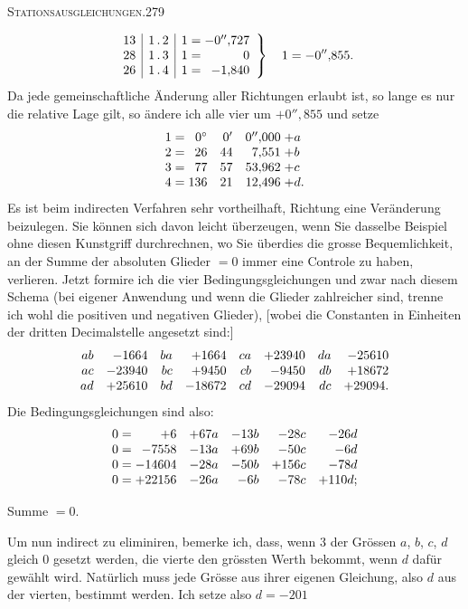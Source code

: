 \clearpage
\noindent\mbox{}\hfill\textsc{Stationsausgleichungen.}\hfill279\par\medskip
\[
\left.\begin{array}{r|c|r@{\;}c@{\;}r}
13&1\,.\,2&1&=&-0''{,}727\\
28&1\,.\,3&1&=&0\\
26&1\,.\,4&1&=&-1{,}840
\end{array}\right\}\quad1=-0''{,}855.
\]
Da jede gemeinschaftliche Änderung aller Richtungen erlaubt ist, so lange es nur die relative Lage gilt, so ändere ich alle vier um $+0''{,}855$ und setze
\[
\begin{array}{r@{\;}c@{\;}rrr@{\;}l}
1&=&0^\circ&0'&0''{,}000&+a\\
2&=&26&44&7{,}551&+b\\
3&=&77&57&53{,}962&+c\\
4&=&136&21&12{,}496&+d.
\end{array}
\]
Es ist beim indirecten Verfahren sehr vortheilhaft,  Richtung eine Veränderung beizulegen. Sie können sich davon leicht überzeugen, wenn Sie dasselbe Beispiel ohne diesen Kunstgriff durchrechnen, wo Sie überdies die grosse Bequemlichkeit, an der Summe der absoluten Glieder $=0$ immer eine Controle zu haben, verlieren. Jetzt formire ich die vier Bedingungsgleichungen und zwar nach diesem Schema (bei eigener Anwendung und wenn die Glieder zahlreicher sind, trenne ich wohl die positiven und negativen Glieder), [wobei die Constanten in Einheiten der dritten Decimalstelle angesetzt sind:]
\[
\begin{array}{rr@{\quad}rr@{\quad}rr@{\quad}rr}
ab&-1664&ba&+1664&ca&+23940&da&-25610\\
ac&-23940&bc&+9450&cb&-9450&db&+18672\\
ad&+25610&bd&-18672&cd&-29094&dc&+29094.
\end{array}
\]
Die Bedingungsgleichungen sind also:
\[
\begin{array}{r@{\;}c@{\;}rrrrr}
0&=&+6&+67a&-13b&-28c&-26d\\
0&=&-7558&-13a&+69b&-50c&-6d\\
0&=&-14604&-28a&-50b&+156c&-78d\\
0&=&+22156&-26a&-6b&-78c&+110d;
\end{array}
\]
\begin{center}Summe $=0$.\end{center}
Um nun indirect zu eliminiren, bemerke ich, dass, wenn 3 der Grössen $a$, $b$, $c$, $d$ gleich 0 gesetzt werden, die vierte den grössten Werth bekommt, wenn $d$ dafür gewählt wird. Natürlich muss jede Grösse aus ihrer eigenen Gleichung, also $d$ aus der vierten, bestimmt werden. Ich setze also $d=-201$

